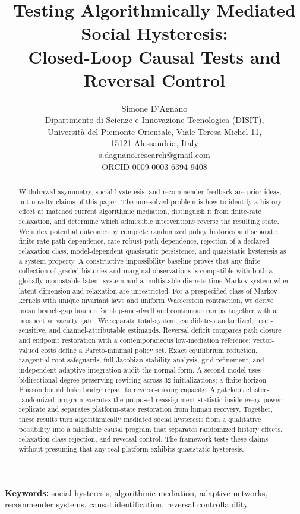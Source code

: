 \documentclass[10pt,a4paper]{article}
\title{Testing Algorithmically Mediated Social Hysteresis:\\
Closed-Loop Causal Tests and Reversal Control}
\author{Simone D'Agnano\\
\small Dipartimento di Scienze e Innovazione Tecnologica (DISIT),\\
\small Universit\`a del Piemonte Orientale, Viale Teresa Michel 11,\\
\small 15121 Alessandria, Italy\\
\small \href{mailto:s.dagnano.research@gmail.com}{s.dagnano.research@gmail.com}\\
\small \href{https://orcid.org/0009-0003-6394-9408}{ORCID 0009-0003-6394-9408}}
\date{}
\begin{document}
\maketitle
\begin{abstract}
Withdrawal asymmetry, social hysteresis, and recommender feedback are prior ideas, not novelty claims of this paper. The unresolved problem is how to identify a history effect at matched current algorithmic mediation, distinguish it from finite-rate relaxation, and determine which admissible interventions reverse the resulting state. We index potential outcomes by complete randomized policy histories and separate finite-rate path dependence, rate-robust path dependence, rejection of a declared relaxation class, model-dependent quasistatic persistence, and quasistatic hysteresis as a system property. A constructive impossibility baseline proves that any finite collection of graded histories and marginal observations is compatible with both a globally monostable latent system and a multistable discrete-time Markov system when latent dimension and relaxation are unrestricted. For a prespecified class of Markov kernels with unique invariant laws and uniform Wasserstein contraction, we derive mean branch-gap bounds for step-and-dwell and continuous ramps, together with a prospective vacuity gate. We separate total-system, candidate-standardized, reset-sensitive, and channel-attributable estimands. Reversal deficit compares path closure and endpoint restoration with a contemporaneous low-mediation reference; vector-valued costs define a Pareto-minimal policy set. Exact equilibrium reduction, tangential-root safeguards, full-Jacobian stability analysis, grid refinement, and independent adaptive integration audit the normal form. A second model uses bidirectional degree-preserving rewiring across 32 initializations; a finite-horizon Poisson bound links bridge repair to reverse-mixing capacity. A gatekept cluster-randomized program executes the proposed reassignment statistic inside every power replicate and separates platform-state restoration from human recovery. Together, these results turn algorithmically mediated social hysteresis from a qualitative possibility into a falsifiable causal program that separates randomized history effects, relaxation-class rejection, and reversal control. The framework tests these claims without presuming that any real platform exhibits quasistatic hysteresis.
\end{abstract}

\noindent\textbf{Keywords:} social hysteresis, algorithmic mediation, adaptive networks, recommender systems, causal identification, reversal controllability
\end{document}
